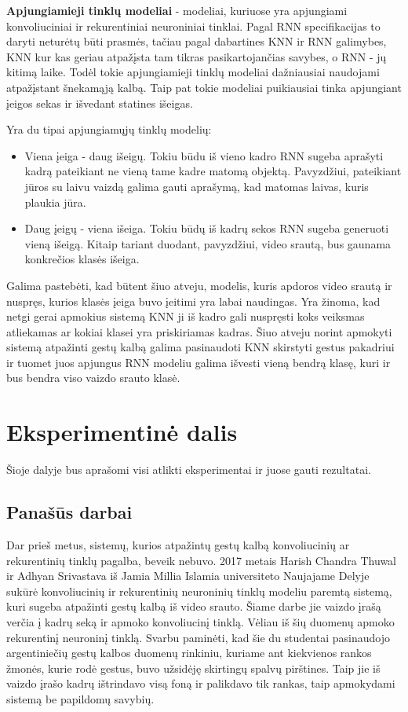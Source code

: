 \documentclass{VUMIFPSbakalaurinis}
\begin{document}
\textbf{Apjungiamieji tinklų modeliai} - modeliai, kuriuose yra apjungiami konvoliuciniai ir rekurentiniai neuroniniai tinklai. Pagal RNN specifikacijas to daryti neturėtų būti prasmės, tačiau pagal dabartines KNN ir RNN galimybes, KNN kur kas geriau atpažįsta tam tikras pasikartojančias savybes, o RNN - jų kitimą laike. Todėl tokie apjungiamieji tinklų modeliai dažniausiai naudojami atpažįstant šnekamąją kalbą. Taip pat tokie modeliai puikiausiai tinka apjungiant įeigos sekas ir išvedant statines išeigas. 

Yra du tipai apjungiamųjų tinklų modelių:
\begin{itemize}
	\item Viena įeiga - daug išeigų. Tokiu būdu iš vieno kadro RNN sugeba aprašyti kadrą pateikiant ne vieną tame kadre matomą objektą. Pavyzdžiui, pateikiant jūros su laivu vaizdą galima gauti aprašymą, kad matomas laivas, kuris plaukia jūra.
	\item Daug įeigų - viena išeiga. Tokiu būdų iš kadrų sekos RNN sugeba generuoti vieną išeigą. Kitaip tariant duodant, pavyzdžiui, video srautą, bus gaunama konkrečios klasės išeiga.
\end{itemize}

Galima pastebėti, kad būtent šiuo atveju, modelis, kuris apdoros video srautą ir nuspręs, kurios klasės įeiga buvo įeitimi yra labai naudingas. Yra žinoma, kad netgi gerai apmokius sistemą KNN ji iš kadro gali nuspręsti koks veiksmas atliekamas ar kokiai klasei yra priskiriamas kadras. Šiuo atveju norint apmokyti sistemą atpažinti gestų kalbą galima pasinaudoti KNN skirstyti gestus pakadriui ir tuomet juos apjungus RNN modeliu galima išvesti vieną bendrą klasę, kuri ir bus bendra viso vaizdo srauto klasė.


\section{Eksperimentinė dalis}

Šioje dalyje bus aprašomi visi atlikti eksperimentai ir juose gauti rezultatai.

\subsection{Panašūs darbai}
Dar prieš metus, sistemų, kurios atpažintų gestų kalbą konvoliucinių ar rekurentinių tinklų pagalba, beveik nebuvo. 2017 metais Harish Chandra Thuwal ir Adhyan Srivastava iš Jamia Millia Islamia universiteto Naujajame Delyje sukūrė konvoliucinių ir rekurentinių neuroninių tinklų modeliu paremtą sistemą, kuri sugeba atpažinti gestų kalbą iš video srauto. Šiame darbe jie vaizdo įrašą verčia į kadrų seką ir apmoko konvoliucinį tinklą. Vėliau iš šių duomenų apmoko rekurentinį neuroninį tinklą. Svarbu paminėti, kad šie du studentai pasinaudojo argentiniečių gestų kalbos duomenų rinkiniu, kuriame ant kiekvienos rankos žmonės, kurie rodė gestus, buvo užsidėję skirtingų spalvų pirštines. Taip jie iš vaizdo įrašo kadrų ištrindavo visą foną ir palikdavo tik rankas, taip apmokydami sistemą be papildomų savybių.
\end{document}
